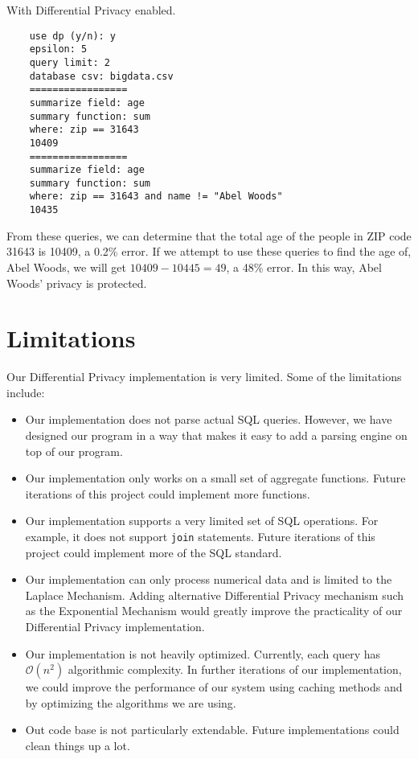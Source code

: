 \documentclass[conference,11pt]{IEEEtran}
\begin{document}
With Differential Privacy enabled.
\begin{verbatim}
    use dp (y/n): y
    epsilon: 5
    query limit: 2
    database csv: bigdata.csv
    =================
    summarize field: age
    summary function: sum
    where: zip == 31643
    10409
    =================
    summarize field: age
    summary function: sum
    where: zip == 31643 and name != "Abel Woods"
    10435
\end{verbatim}
From these queries, we can determine that the total age of the people in ZIP
code 31643 is 10409, a 0.2\% error. If we attempt to use these queries to find
the age of, Abel Woods, we will get $10409 - 10445 = 49$, a 48\% error. In this
way, Abel Woods' privacy is protected.

\section{Limitations}\label{sec:limitations}
Our Differential Privacy implementation is very limited. Some of the limitations
include:
\begin{itemize}
    \item Our implementation does not parse actual SQL queries. However, we
        have designed our program in a way that makes it easy to add a parsing
        engine on top of our program.
    \item Our implementation only works on a small set of aggregate functions.
        Future iterations of this project could implement more functions.
    \item Our implementation supports a very limited set of SQL operations. For
        example, it does not support \texttt{join} statements.  Future
        iterations of this project could implement more of the SQL standard.
    \item Our implementation can only process numerical data and is limited to
        the Laplace Mechanism. Adding alternative Differential Privacy mechanism
        such as the Exponential Mechanism would greatly improve the practicality
        of our Differential Privacy implementation.
    \item Our implementation is not heavily optimized. Currently, each query has
        $\mathcal{O}(n^2)$ algorithmic complexity. In further iterations of our
        implementation, we could improve the performance of our system using
        caching methods and by optimizing the algorithms we are using.
   \item Out code base is not particularly extendable. Future implementations
        could clean things up a lot.
\end{itemize}
\end{document}
